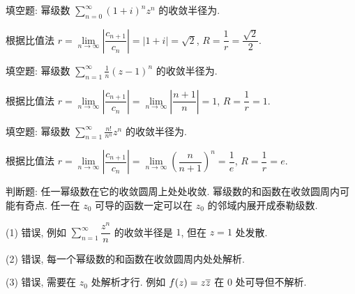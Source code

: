 	
\begin{exercise}
	填空题: 幂级数 $\displaystyle\sum_{n=0}^\infty(1+i)^nz^n$ 的收敛半径为.
\end{exercise}
\begin{solution}[解析]
	根据比值法 $r=\lim\limits_{n\to\infty} \left|\dfrac{c_{n+1}}{c_n}\right|=|1+i|=\sqrt 2$, $R=\dfrac1r=\dfrac{\sqrt2}2$.
\end{solution}

	
\begin{exercise}
	填空题: 幂级数 $\displaystyle\sum_{n=1}^\infty\frac1n(z-1)^n$ 的收敛半径为.
\end{exercise}
\begin{solution}[解析]
	根据比值法 $r=\lim\limits_{n\to\infty} \left|\dfrac{c_{n+1}}{c_n}\right|
	=\lim\limits_{n\to\infty} \left|\dfrac{n+1}{n}\right|=1$, $R=\dfrac1r=1$.
\end{solution}


\begin{exercise}
	填空题: 幂级数 $\displaystyle\sum_{n=1}^\infty\frac{n!}{n^n}z^n$ 的收敛半径为.
\end{exercise}
\begin{solution}[解析]
	根据比值法 $r=\lim\limits_{n\to\infty} \left|\dfrac{c_{n+1}}{c_n}\right|
	=\lim\limits_{n\to\infty} \left(\dfrac{n}{n+1}\right)^n=\dfrac1e$, $R=\dfrac1r=e$.
\end{solution}


\begin{exercise}
	判断题:
	\subex 任一幂级数在它的收敛圆周上处处收敛. \fillbrace{\falseex}
	\subex 幂级数的和函数在收敛圆周内可能有奇点. \fillbrace{\falseex}
	\subex 任一在 $z_0$ 可导的函数一定可以在 $z_0$ 的邻域内展开成泰勒级数. \fillbrace{\falseex}
\end{exercise}
\begin{solution}[解析]
	(1) 错误, 例如 $\sum\limits_{n=1}^\infty\dfrac{z^n}{n}$ 的收敛半径是 $1$, 但在 $z=1$ 处发散.

	(2) 错误, 每一个幂级数的和函数在收敛圆周内处处解析.

	(3) 错误, 需要在 $z_0$ 处解析才行. 例如 $f(z)=z\overline z$ 在 $0$ 处可导但不解析.
\end{solution}



